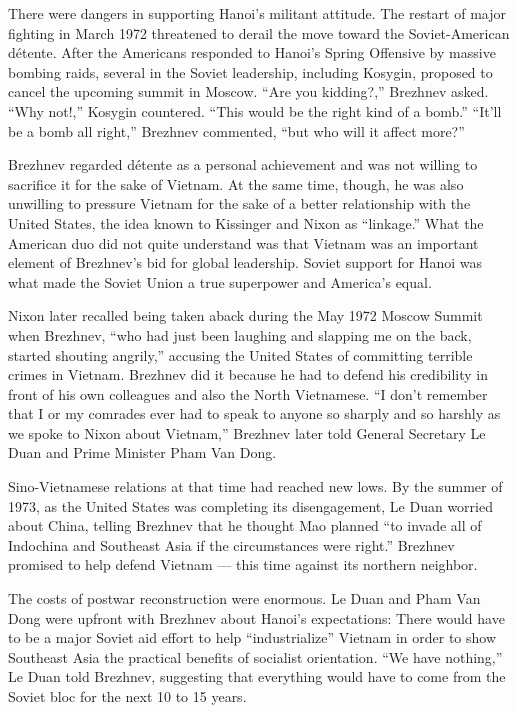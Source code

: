 There were dangers in supporting Hanoi's militant attitude. The restart
of major fighting in March 1972 threatened to derail the move toward the
Soviet-American détente. After the Americans responded to Hanoi's Spring
Offensive by massive bombing raids, several in the Soviet leadership,
including Kosygin, proposed to cancel the upcoming summit in Moscow.
``Are you kidding?,'' Brezhnev asked. ``Why not!,'' Kosygin countered.
``This would be the right kind of a bomb.'' ``It'll be a bomb all
right,'' Brezhnev commented, ``but who will it affect more?''

Brezhnev regarded détente as a personal achievement and was not willing
to sacrifice it for the sake of Vietnam. At the same time, though, he
was also unwilling to pressure Vietnam for the sake of a better
relationship with the United States, the idea known to Kissinger and
Nixon as ``linkage.'' What the American duo did not quite understand was
that Vietnam was an important element of Brezhnev's bid for global
leadership. Soviet support for Hanoi was what made the Soviet Union a
true superpower and America's equal.

Nixon later recalled being taken aback during the May 1972 Moscow Summit
when Brezhnev, ``who had just been laughing and slapping me on the back,
started shouting angrily,'' accusing the United States of committing
terrible crimes in Vietnam. Brezhnev did it because he had to defend his
credibility in front of his own colleagues and also the North
Vietnamese. ``I don't remember that I or my comrades ever had to speak
to anyone so sharply and so harshly as we spoke to Nixon about
Vietnam,'' Brezhnev later told General Secretary Le Duan and Prime
Minister Pham Van Dong.

Sino-Vietnamese relations at that time had reached new lows. By the
summer of 1973, as the United States was completing its disengagement,
Le Duan worried about China, telling Brezhnev that he thought Mao
planned ``to invade all of Indochina and Southeast Asia if the
circumstances were right.'' Brezhnev promised to help defend Vietnam ---
this time against its northern neighbor.

The costs of postwar reconstruction were enormous. Le Duan and Pham Van
Dong were upfront with Brezhnev about Hanoi's expectations: There would
have to be a major Soviet aid effort to help ``industrialize'' Vietnam
in order to show Southeast Asia the practical benefits of socialist
orientation. ``We have nothing,'' Le Duan told Brezhnev, suggesting that
everything would have to come from the Soviet bloc for the next 10 to 15
years.

